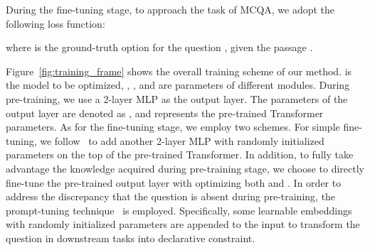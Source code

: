 During the fine-tuning stage, to approach the task of MCQA, we adopt the following loss function:

where  is the ground-truth option for the question , given the passage .






Figure~\ref{fig:training_frame} shows the overall training scheme of our method.  is the model to be optimized, , ,  and  are parameters of different modules. 
During pre-training, we use a 2-layer MLP as the output layer. The parameters of the output layer are denoted as , and  represents the pre-trained Transformer parameters.
As for the fine-tuning stage, we employ two schemes. 
For simple fine-tuning, we follow~\citet{bert} to add another 2-layer MLP with randomly initialized parameters  on the top of the pre-trained Transformer.
In addition, to fully take advantage the knowledge acquired during pre-training stage, we choose to directly fine-tune the pre-trained output layer with optimizing both  and .
In order to address the discrepancy that the question is absent during pre-training, the prompt-tuning technique~\citep{prompt-tuning} is employed.
Specifically, some learnable embeddings with randomly initialized parameters  are appended to the input to transform the question in downstream tasks into declarative constraint.